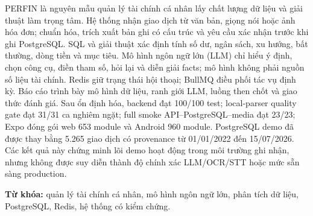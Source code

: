 
PERFIN là nguyên mẫu quản lý tài chính cá nhân lấy chất lượng dữ liệu và giải thuật làm trọng tâm. Hệ thống nhận giao dịch từ văn bản, giọng nói hoặc ảnh hóa đơn; chuẩn hóa, trích xuất bản ghi có cấu trúc và yêu cầu xác nhận trước khi ghi PostgreSQL. SQL và giải thuật xác định tính số dư, ngân sách, xu hướng, bất thường, dòng tiền và mục tiêu. Mô hình ngôn ngữ lớn (LLM) chỉ hiểu ý định, chọn công cụ, điền tham số, hỏi lại và diễn giải facts; mô hình không phải nguồn số liệu tài chính. Redis giữ trạng thái hội thoại; BullMQ điều phối tác vụ định kỳ. Báo cáo trình bày mô hình dữ liệu, ranh giới LLM, luồng then chốt và giao thức đánh giá. Sau ổn định hóa, backend đạt 100/100 test; local-parser quality gate đạt 31/31 ca nghiêm ngặt; full smoke API--PostgreSQL--media đạt 23/23; Expo đóng gói web 653 module và Android 960 module. PostgreSQL demo đã được thay bằng 5.265 giao dịch có provenance từ 01/01/2022 đến 15/07/2026. Các kết quả này chứng minh lõi demo hoạt động trong môi trường ghi nhận, nhưng không được suy diễn thành độ chính xác LLM/OCR/STT hoặc mức sẵn sàng production.

\vspace{0.5cm}
\noindent\textbf{Từ khóa:} quản lý tài chính cá nhân, mô hình ngôn ngữ lớn, phân tích dữ liệu, PostgreSQL, Redis, hệ thống có kiểm chứng.
